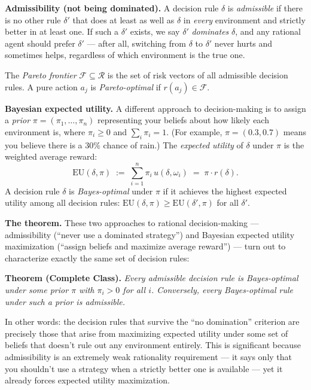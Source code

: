 \documentclass[11pt]{article}
\begin{document}
\begin{exercise}
\medskip
\noindent
\textbf{Admissibility (not being dominated).} A decision rule $\delta$ is
\emph{admissible} if there is no other rule $\delta'$ that does at least as well as
$\delta$ in \emph{every} environment and strictly better in at least one. If such a
$\delta'$ exists, we say $\delta'$ \emph{dominates} $\delta$, and any rational agent
should prefer $\delta'$ --- after all, switching from $\delta$ to $\delta'$ never
hurts and sometimes helps, regardless of which environment is the true one.

\medskip
\noindent
The \emph{Pareto frontier} $\mathcal{F} \subseteq \mathcal{R}$ is the set of risk
vectors of all admissible decision rules. A pure action $a_j$ is
\emph{Pareto-optimal} if $r(a_j) \in \mathcal{F}$.

\medskip
\noindent
\textbf{Bayesian expected utility.} A different approach to decision-making is to
assign a \emph{prior} $\pi = (\pi_1, \ldots, \pi_n)$ representing your beliefs about
how likely each environment is, where $\pi_i \geq 0$ and $\sum_i \pi_i = 1$. (For
example, $\pi = (0.3, 0.7)$ means you believe there is a $30\%$ chance of rain.) The
\emph{expected utility} of $\delta$ under $\pi$ is the weighted average reward:
\[
  \mathrm{EU}(\delta, \pi) \;:=\;
  \sum_{i=1}^n \pi_i\, u(\delta, \omega_i) \;=\; \pi \cdot r(\delta).
\]
A decision rule $\delta$ is \emph{Bayes-optimal} under $\pi$ if it achieves the
highest expected utility among all decision rules:
$\mathrm{EU}(\delta, \pi) \geq \mathrm{EU}(\delta', \pi)$ for all $\delta'$.

\medskip
\noindent
\textbf{The theorem.} These two approaches to rational decision-making ---
admissibility (``never use a dominated strategy'') and Bayesian expected utility
maximization (``assign beliefs and maximize average reward'') --- turn out to
characterize exactly the same set of decision rules:

\medskip
\noindent
\textbf{Theorem (Complete Class).} \emph{Every admissible decision rule is
Bayes-optimal under some prior $\pi$ with $\pi_i > 0$ for all $i$. Conversely, every
Bayes-optimal rule under such a prior is admissible.}

\medskip
\noindent
In other words: the decision rules that survive the ``no domination'' criterion are
precisely those that arise from maximizing expected utility under some set of beliefs
that doesn't rule out any environment entirely. This is significant because
admissibility is an extremely weak rationality requirement --- it says only that you
shouldn't use a strategy when a strictly better one is available --- yet it already
forces expected utility maximization.


\end{exercise}
\end{document}
